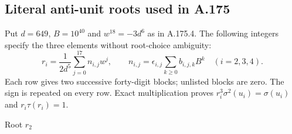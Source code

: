 \subsection*{Literal anti-unit roots used in A.175}
Put $d=649$, $B=10^{40}$ and $w^{18}=-3d^6$ as in A.175.4.
The following integers specify the three elements without root-choice ambiguity:
\[r_i=\frac1{2d^5}\sum_{j=0}^{17}n_{i,j}w^j,\qquad
n_{i,j}=\epsilon_{i,j}\sum_{k\geq0}b_{i,j,k}B^k\quad(i=2,3,4).\]
Each row gives two successive forty-digit blocks; unlisted blocks are zero.
The sign is repeated on every row. Exact multiplication proves
$r_i^3\sigma^2(u_i)=\sigma(u_i)$ and $r_i\tau(r_i)=1$.
\begingroup\setlength{\tabcolsep}{3pt}\fontsize{7.6}{9.2}\selectfont\ttfamily
\par\medskip\normalfont\normalsize Root $r_2$\par\smallskip
\fontsize{7.6}{9.2}\selectfont\ttfamily
